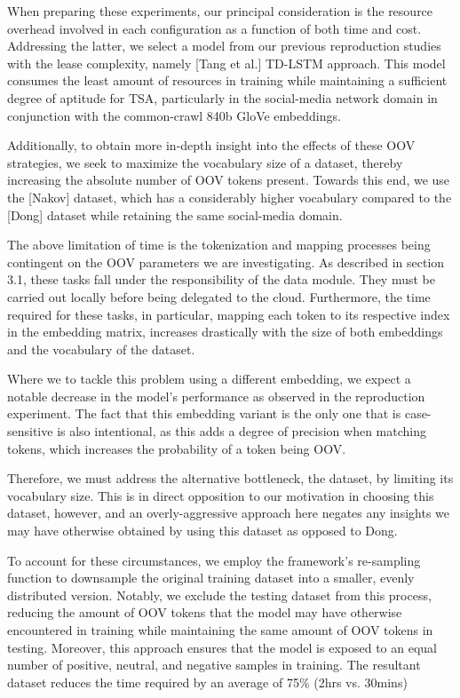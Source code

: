 \documentclass[../../fyp.tex]{subfiles}
\begin{document}
When preparing these experiments, our principal consideration is the resource overhead involved in each configuration as a function of both time and cost. Addressing the latter, we select a model from our previous reproduction studies with the lease complexity, namely [Tang et al.] TD-LSTM approach. This model consumes the least amount of resources in training while maintaining a sufficient degree of aptitude for TSA, particularly in the social-media network domain in conjunction with the common-crawl 840b GloVe embeddings. 

Additionally, to obtain more in-depth insight into the effects of these OOV strategies, we seek to maximize the vocabulary size of a dataset, thereby increasing the absolute number of OOV tokens present. Towards this end, we use the [Nakov] dataset, which has a considerably higher vocabulary compared to the [Dong] dataset while retaining the same social-media domain.

The above limitation of time is the tokenization and mapping processes being contingent on the OOV parameters we are investigating. As described in section 3.1, these tasks fall under the responsibility of the data module. They must be carried out locally before being delegated to the cloud. Furthermore, the time required for these tasks, in particular, mapping each token to its respective index in the embedding matrix, increases drastically with the size of both embeddings and the vocabulary of the dataset.

Where we to tackle this problem using a different embedding, we expect a notable decrease in the model's performance as observed in the reproduction experiment. The fact that this embedding variant is the only one that is case-sensitive is also intentional, as this adds a degree of precision when matching tokens, which increases the probability of a token being OOV. 

Therefore, we must address the alternative bottleneck, the dataset, by limiting its vocabulary size. This is in direct opposition to our motivation in choosing this dataset, however, and an overly-aggressive approach here negates any insights we may have otherwise obtained by using this dataset as opposed to Dong.

To account for these circumstances, we employ the framework's re-sampling function to downsample the original training dataset into a smaller, evenly distributed version. Notably, we exclude the testing dataset from this process, reducing the amount of OOV tokens that the model may have otherwise encountered in training while maintaining the same amount of OOV tokens in testing. Moreover, this approach ensures that the model is exposed to an equal number of positive, neutral, and negative samples in training.
The resultant dataset reduces the time required by an average of 75\% (2hrs vs. 30mins)
\end{document}
